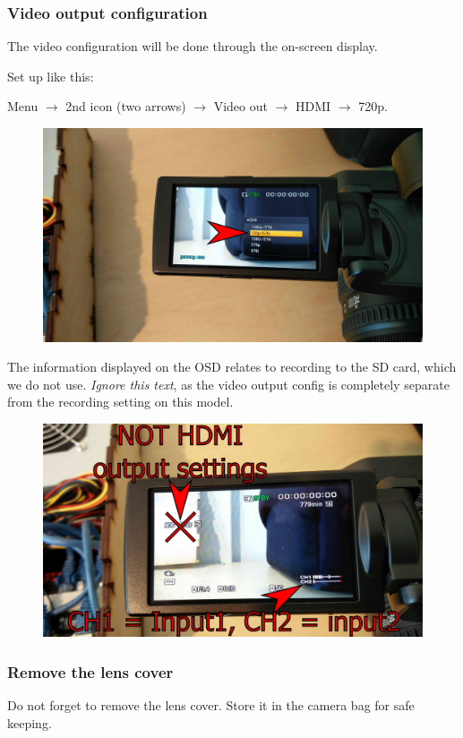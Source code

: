 \documentclass{article}
\begin{document}
\subsubsection{Video output configuration}
The video configuration will be done through the on-screen display.

Set up like this:

Menu $\rightarrow$ 2nd icon (two arrows) $\rightarrow$ Video out $\rightarrow$ HDMI $\rightarrow$ 720p.
\begin{figure}[H]
  \centering
\includegraphics[width = 120mm]{Sony05.jpg}
\end{figure}

The information displayed on the OSD relates to recording to the SD card, which we do not use. \emph{Ignore this text}, as the video output config is completely separate from the recording setting on this model.
\begin{figure}[H]
  \centering
\includegraphics[width = 120mm]{Sony06.jpg}
\end{figure}

\subsubsection{Remove the lens cover}
Do not forget to remove the lens cover. Store it in the camera bag for safe keeping.
\end{document}
